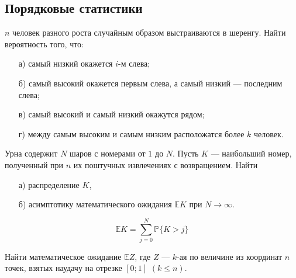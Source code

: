 

\subsection{Порядковые статистики}

\begin{problem}
$n$ человек разного роста случайным образом выстраиваются в шеренгу. Найти вероятность того, что: 
\begin{enumerate}
\item[а)] самый низкий окажется $i$-м слева; 
\item[б)] самый высокий окажется первым слева, а самый низкий --- последним слева; 
\item[в)] самый высокий и самый низкий окажутся рядом; 
\item[г)] между самым высоким и самым низким расположатся более $k$ человек. 
\end{enumerate}
\end{problem}


\begin{problem}
Урна содержит $N$ шаров с номерами от $1$ до $N$. Пусть $K$ --- наибольший номер, полученный при $n$ их поштучных извлечениях 
с возвращением. Найти 
\begin{enumerate}
\item[а)] распределение $K$, 
\item[б)] асимптотику математического ожидания ${\mathbb E}K$ при $N\to\infty$. 
\end{enumerate}
\end{problem}

\begin{ordre}
\[
{\mathbb E}K=\sum\limits_{j=0}^{N} {\mathbb P}\{ K>j\}
\]
\end{ordre}

\begin{problem}
Найти математическое ожидание ${\mathbb E}Z$, где $Z$ --- $k$-ая по величине из координат $n$ точек, взятых наудачу на отрезке 
$[0;1]$ $(k \leqslant n)$. 
\end{problem}

